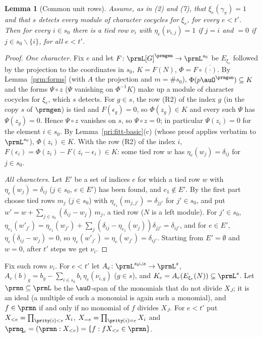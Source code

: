 \documentclass[10pt]{amsart}
\newtheorem{lemma}[theorem]{Lemma}
\theoremstyle{definition}
\theoremstyle{remark}
\begin{document}
\begin{lemma}[Common unit rows]\label{prm:unit}
Assume, as in {\rm(2)} and {\rm(7)}, that $\xi_e(\gamma_\pi)=1$ and that $s$ detects every module of
character cocycles for $\xi_e$, for every $e<t'$. Then for every $i\in s_0$ there is a tied row
$\nu_i$ with $\eta_e(\nu_{i,j})=1$ if $j=i$ and $=0$ if $j\in s_0\smallsetminus\{i\}$, for all $e<t'$.
\end{lemma}
\begin{proof}
\emph{One character.} Fix $e$ and let $F\colon\prmL[G]^{\prmgen}\to\prmL^{s_0}$ be $E_{\xi_e}$ followed by
the projection to the coordinates in $s_0$, $K=F(N)$, $\Phi=F\circ\overline{(\cdot)}$. By
Lemma~\ref{prm:forms} (with $A$ the projection and $m=\#s_0$), $\Phi(p\auO^{\prmgen})\subseteq K$ and
the forms $\Psi\circ z$ ($\Psi$ vanishing on $\Phi^{-1}K$) make up a module of character cocycles for
$\xi_e$, which $s$ detects. For $g\in s$, the row (R2) of the index $g$ (in the copy $s$ of
$\prmgen$) is tied and $F(\epsilon_g)=0$, so $\Phi(z_g)\in K$ and every such $\Psi$ has $\Psi(z_g)=0$.
Hence $\Psi\circ z$ vanishes on $s$, so $\Psi\circ z=0$; in particular $\Psi(z_{i})=0$ for the element
$i\in s_0$. By Lemma~\ref{pri:fitt-basic}(c) (whose proof applies verbatim to $\prmL^{s_0}$),
$\Phi(z_i)\in K$. With the row (R2) of the index $i$, $F(\epsilon_i)=\Phi(z_i)-F(\overline{z_i}-
\epsilon_i)\in K$: some tied row $w$ has $\eta_e(w_j)=\delta_{ij}$ for $j\in s_0$.

\emph{All characters.} Let $E'$ be a set of indices $e$ for which a tied row $w$ with $\eta_{e}(w_j)=
\delta_{ij}$ ($j\in s_0$, $e\in E'$) has been found, and $e_1\notin E'$. By the first part choose tied
rows $m_{j}$ ($j\in s_0$) with $\eta_{e_1}(m_{j,j'})=\delta_{jj'}$ for $j'\in s_0$, and put
$w'=w+\sum_{j\in s_0}(\delta_{ij}-w_j)\,m_j$, a tied row ($N$ is a left module). For $j'\in s_0$,
$\eta_{e_1}(w'_{j'})=\eta_{e_1}(w_{j'})+\sum_j(\delta_{ij}-\eta_{e_1}(w_j))\delta_{jj'}=\delta_{ij'}$,
and for $e\in E'$, $\eta_e(\delta_{ij}-w_j)=0$, so $\eta_e(w'_{j'})=\eta_e(w_{j'})=\delta_{ij'}$.
Starting from $E'=\emptyset$ and $w=0$, after $t'$ steps we get $\nu_i$.
\end{proof}

Fix such rows $\nu_i$. For $e<t'$ let $A_e\colon\prmL^{s_0\sqcup s}\to\prmL^s$, $A_e(b)_g=b_g-\sum_{i\in
s_0}b_i\,\eta_e(\nu_{i,g})$ ($g\in s$), and $K_e=A_e(E_{\xi_e}(N))\subseteq\prmL^s$. Let $\prmn\subseteq
\prmL$ be the $\auO$-span of the monomials that do not divide $X_J$; it is an ideal (a multiple of such
a monomial is again such a monomial), and $f\in\prmn$ if and only if no monomial of $f$ divides $X_J$.
For $e<t'$ put $X_{<e}=\prod_{\prity(i)<e}X_i$, $X_{=e}=\prod_{\prity(i)=e}X_i$ and $\prmq_e=(\prmn:
X_{<e})=\{f:fX_{<e}\in\prmn\}$.
\end{document}
